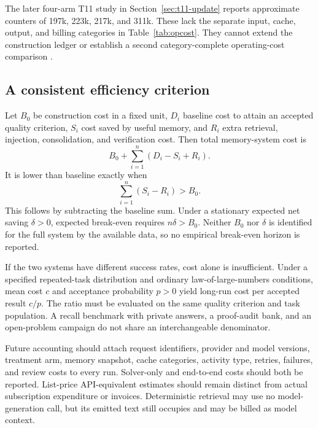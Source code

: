 The later four-arm T11 study in Section~\ref{sec:t11-update} reports approximate counters of 197k, 223k, 217k, and 311k. These lack the separate input, cache, output, and billing categories in Table~\ref{tab:opcost}. They cannot extend the construction ledger or establish a second category-complete operating-cost comparison \citep{benchmark_update_t11_result}.

\subsection{A consistent efficiency criterion}

Let $B_0$ be construction cost in a fixed unit, $D_i$ baseline cost to attain an accepted quality criterion, $S_i$ cost saved by useful memory, and $R_i$ extra retrieval, injection, consolidation, and verification cost. Then total memory-system cost is
\[
B_0+\sum_{i=1}^n(D_i-S_i+R_i).
\]
It is lower than baseline exactly when
\[
\sum_{i=1}^n(S_i-R_i)>B_0.
\]
This follows by subtracting the baseline sum. Under a stationary expected net saving $\delta>0$, expected break-even requires $n\delta>B_0$. Neither $B_0$ nor $\delta$ is identified for the full system by the available data, so no empirical break-even horizon is reported.

If the two systems have different success rates, cost alone is insufficient. Under a specified repeated-task distribution and ordinary law-of-large-numbers conditions, mean cost $c$ and acceptance probability $p>0$ yield long-run cost per accepted result $c/p$. The ratio must be evaluated on the same quality criterion and task population. A recall benchmark with private answers, a proof-audit bank, and an open-problem campaign do not share an interchangeable denominator.

Future accounting should attach request identifiers, provider and model versions, treatment arm, memory snapshot, cache categories, activity type, retries, failures, and review costs to every run. Solver-only and end-to-end costs should both be reported. List-price API-equivalent estimates should remain distinct from actual subscription expenditure or invoices. Deterministic retrieval may use no model-generation call, but its emitted text still occupies and may be billed as model context.
